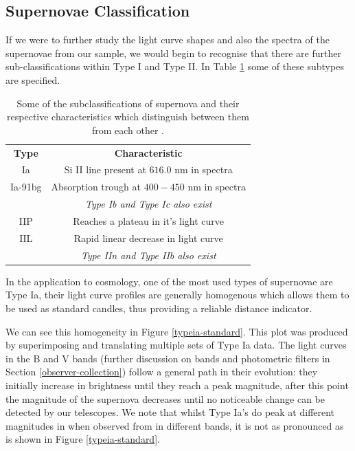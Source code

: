 \documentclass[twocolumn]{revtex4}
\newcommand{\squeezeup}{\vspace{-2.5mm}}
\begin{document}
\vspace{-3ex}
\subsection{Supernovae Classification}
\vspace{-2ex}

If we were to further study the light curve shapes and also the spectra of the supernovae from our sample, we would begin to recognise that there are further sub-classifications within Type I and Type II. In Table \ref{sn_classes} some of these subtypes are specified.

\begin{table}[h!]
\centering
\begin{tabular}{c@{\hskip 20pt}c} 
 \hline
 \textbf{Type} & \textbf{Characteristic} \\ 
 Ia		& Si II line present at $616.0$ nm in spectra \\
 Ia-91bg	& Absorption trough at $400-450$ nm in spectra \\
 		& \em Type Ib and Type Ic also exist \em \\
 IIP 		& Reaches a plateau in it's light curve  \\
 IIL		& Rapid linear decrease in light curve \\
 		& \em Type IIn and Type IIb also exist \em \\
 \hline
\end{tabular}
\caption{Some of the subclassifications of supernova and their respective characteristics which distinguish between them from each other \cite{longair, obs_phys_class_sn}.}
\label{sn_classes}
\end{table}
\squeezeup

In the application to cosmology, one of the most used types of supernovae are Type Ia, their light curve profiles are generally homogenous which allows them to be used as standard candles, thus providing a reliable distance indicator.  

We can see this homogeneity in Figure \ref{typeia-standard}. This plot was produced by superimposing and translating multiple sets of Type Ia data. The light curves in the B and V bands (further discussion on bands and photometric filters in Section \ref{observer-collection}) follow a general path in their evolution: they initially increase in brightness until they reach a peak magnitude, after this point the magnitude of the supernova decreases until no noticeable change can be detected by our telescopes. We note that whilst Type Ia's do peak at different magnitudes in when observed from in different bands, it is not as pronounced as is shown in Figure \ref{typeia-standard}.
\end{document}
